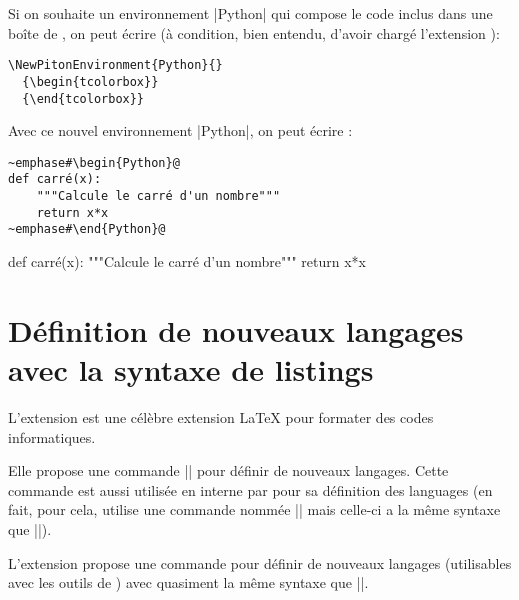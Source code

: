 \documentclass[dvipsnames,svgnames]{article}
\begin{document}
\bigskip
Si on souhaite un environnement |{Python}| qui compose le code inclus dans une boîte de
, on peut écrire (à condition, bien entendu, d'avoir chargé l'extension
):

\begin{Verbatim}
\NewPitonEnvironment{Python}{}
  {\begin{tcolorbox}}
  {\end{tcolorbox}}
\end{Verbatim}

\bigskip
Avec ce nouvel environnement |{Python}|, on peut écrire : 

\begin{Verbatim}
~emphase#\begin{Python}@
def carré(x):
    """Calcule le carré d'un nombre"""
    return x*x
~emphase#\end{Python}@
\end{Verbatim}

  {\begin{tcolorbox}}
  {\end{tcolorbox}}

\begin{Python}
def carré(x):
    """Calcule le carré d'un nombre"""
    return x*x
\end{Python}

\section{Définition de nouveaux langages avec la syntaxe de listings}

\label{NewPitonLanguage}

\medskip
L'extension  est une célèbre extension LaTeX pour formater des codes informatiques.  

\medskip
Elle propose une commande |\lstdefinelanguage| pour définir de nouveaux langages. Cette
commande est aussi utilisée en interne par  pour sa définition des languages
(en fait, pour cela,  utilise une commande nommée |\lst@definelanguage| mais
celle-ci a la même syntaxe que |\lstdefinelanguage|).

\medskip
L'extension  propose une commande  pour
définir de nouveaux langages (utilisables avec les outils de ) avec quasiment
la même syntaxe que |\lstdefinelanguage|.
\end{document}
